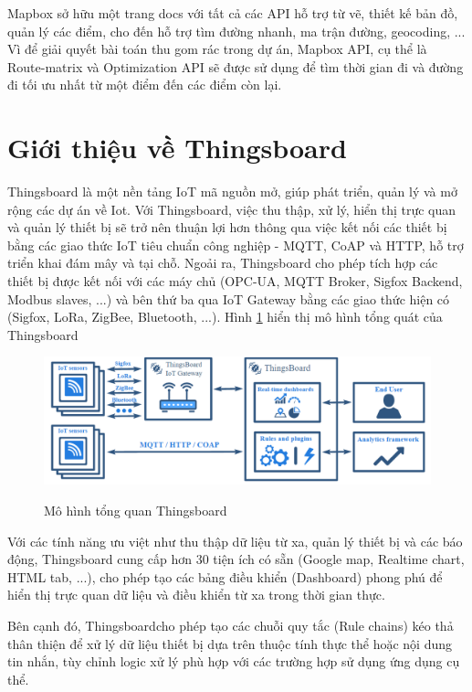 Mapbox sở hữu một trang docs với tất cả các API hỗ trợ từ vẽ, thiết kế bản đồ, quản lý các điểm, cho đến hỗ trợ tìm đường nhanh, ma trận đường, geocoding, ... Vì để giải quyết bài toán thu gom rác trong dự án, Mapbox API, cụ thể là Route-matrix và Optimization API sẽ được sử dụng để tìm thời gian đi và đường đi tối ưu nhất từ một điểm đến các điểm còn lại. 

\section{Giới thiệu về Thingsboard}
Thingsboard là một nền tảng IoT mã nguồn mở, giúp phát triển, quản lý và mở rộng các dự án về Iot. Với Thingsboard, việc thu thập, xử lý, hiển thị trực quan và quản lý thiết bị sẽ trở nên thuận lợi hơn thông qua việc kết nối các thiết bị bằng các giao thức IoT tiêu chuẩn công nghiệp - MQTT, CoAP và HTTP, hỗ trợ triển khai đám mây và tại chỗ. Ngoải ra, Thingsboard cho phép tích hợp các thiết bị được kết nối với các máy chủ (OPC-UA, MQTT Broker, Sigfox Backend, Modbus slaves, ...) và bên thứ ba qua IoT Gateway bằng các giao thức hiện có (Sigfox, LoRa, ZigBee, Bluetooth, ...). Hình \ref{fig:thingsboard_overall} hiển thị mô hình tổng quát của Thingsboard

\begin{figure}[h]
    \centering
    \includegraphics[width=\textwidth]{images/Khanh/Thingsboard/thingsboard_overall.png}
    \caption{Mô hình tổng quan Thingsboard} \cite{thingsboard}
    \label{fig:thingsboard_overall}
\end{figure}

Với các tính năng ưu việt như thu thập dữ liệu từ xa, quản lý thiết bị và các báo động, Thingsboard cung cấp hơn 30 tiện ích có sẵn (Google map, Realtime chart, HTML tab, ...), cho phép tạo các bảng điều khiển (Dashboard) phong phú để hiển thị trực quan dữ liệu và điều khiển từ xa trong thời gian thực.

Bên cạnh đó, Thingsboardcho phép tạo các chuỗi quy tắc (Rule chains) kéo thả thân thiện để xử lý dữ liệu thiết bị dựa trên thuộc tính thực thể hoặc nội dung tin nhắn, tùy chỉnh logic xử lý phù hợp với các trường hợp sử dụng ứng dụng cụ thể. 


